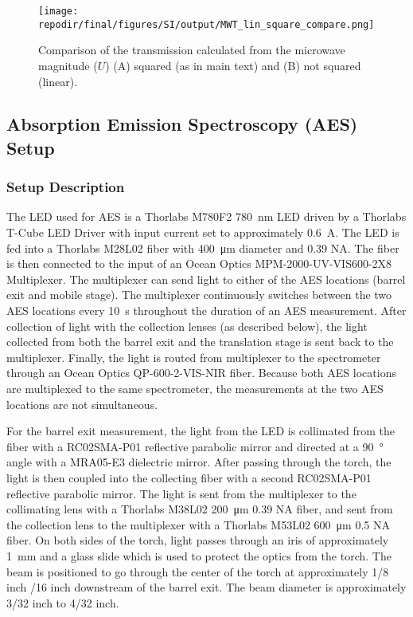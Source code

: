 
\begin{figure}[H]
\centering
\texttt{[image: \\repodir/final/figures/SI/output/MWT\_lin\_square\_compare.png]}
\caption{Comparison of the transmission calculated from the microwave magnitude ($U$) (A) squared (as in main text) and (B) not squared (linear).}
\label{fig:SI_MWT_lin_square_compare}
\end{figure}


\clearpage
\subsection{Absorption Emission Spectroscopy (AES) Setup}

\subsubsection{Setup Description}

The LED used for AES is a Thorlabs M780F2 \SI{780} {\nano\meter} LED driven by a Thorlabs T-Cube LED Driver with input current set to approximately \SI{0.6} {\ampere}. The LED is fed into a Thorlabs M28L02 fiber with \SI{400} {\micro\meter} diameter and 0.39 NA. The fiber is then connected to the input of an Ocean Optics MPM-2000-UV-VIS600-2X8 Multiplexer. The multiplexer can send light to either of the AES locations (barrel exit and mobile stage). The multiplexer continuously switches between the two AES locations every \SI{10} {\second} throughout the duration of an AES measurement. After collection of light with the collection lenses (as described below), the light collected from both the barrel exit and the translation stage is sent back to the multiplexer. Finally, the light is routed from multiplexer to the spectrometer through an Ocean Optics QP-600-2-VIS-NIR fiber. Because both AES locations are multiplexed to the same spectrometer, the measurements at the two AES locations are not simultaneous.

For the barrel exit measurement, the light from the LED is collimated from the fiber with a RC02SMA-P01 reflective parabolic mirror and directed at a \SI{90} {\degree} angle with a MRA05-E3 dielectric mirror. After passing through the torch, the light is then coupled into the collecting fiber with a second RC02SMA-P01 reflective parabolic mirror. The light is sent from the multiplexer to the collimating lens with a Thorlabs M38L02 \SI{200} {\micro\meter} 0.39 NA fiber, and sent from the collection lens to the multiplexer with a Thorlabs M53L02 \SI{600} {\micro\meter} 0.5 NA fiber. On both sides of the torch, light passes through an iris of approximately \SI{1} {\milli\meter} and a glass slide which is used to protect the optics from the torch. The beam is positioned to go through the center of the torch at approximately 1/8 inch /16 inch downstream of the barrel exit. The beam diameter is approximately 3/32 inch to 4/32 inch. 

